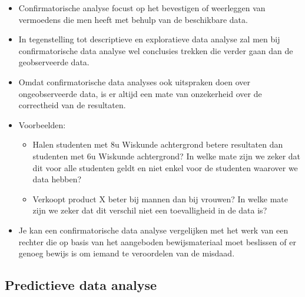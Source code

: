 \documentclass[]{memoir}
\providecommand{\tightlist}{%
  \setlength{\itemsep}{0pt}\setlength{\parskip}{0pt}}
\begin{document}
\begin{itemize}
\tightlist
\item
  Confirmatorische analyse focust op het bevestigen of weerleggen van vermoedens die men heeft met behulp van de beschikbare data.
\item
  In tegenstelling tot descriptieve en exploratieve data analyse zal men bij confirmatorische data analyse wel conclusies trekken die verder gaan dan de geobserveerde data.
\item
  Omdat confirmatorische data analyses ook uitspraken doen over ongeobserveerde data, is er altijd een mate van onzekerheid over de correctheid van de resultaten.
\item
  Voorbeelden:

  \begin{itemize}
  \tightlist
  \item
    Halen studenten met 8u Wiskunde achtergrond betere resultaten dan studenten met 6u Wiskunde achtergrond? In welke mate zijn we zeker dat dit voor alle studenten geldt en niet enkel voor de studenten waarover we data hebben?
  \item
    Verkoopt product X beter bij mannen dan bij vrouwen? In welke mate zijn we zeker dat dit verschil niet een toevalligheid in de data is?
  \end{itemize}
\item
  Je kan een confirmatorische data analyse vergelijken met het werk van een rechter die op basis van het aangeboden bewijsmateriaal moet beslissen of er genoeg bewijs is om iemand te veroordelen van de misdaad.
\end{itemize}

\hypertarget{predictieve-data-analyse}{%
\subsection*{Predictieve data analyse}\label{predictieve-data-analyse}}
\end{document}
